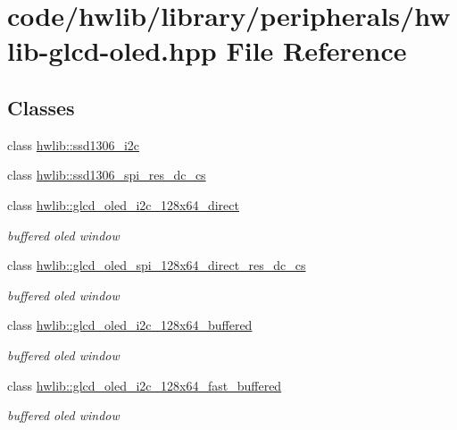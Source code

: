 \hypertarget{library_2peripherals_2hwlib-glcd-oled_8hpp}{}\section{code/hwlib/library/peripherals/hwlib-\/glcd-\/oled.hpp File Reference}
\label{library_2peripherals_2hwlib-glcd-oled_8hpp}
\subsection*{Classes}
\begin{DoxyCompactItemize}
\item 
class \hyperlink{classhwlib_1_1ssd1306__i2c}{hwlib\+::ssd1306\+\_\+i2c}
\item 
class \hyperlink{classhwlib_1_1ssd1306__spi__res__dc__cs}{hwlib\+::ssd1306\+\_\+spi\+\_\+res\+\_\+dc\+\_\+cs}
\item 
class \hyperlink{classhwlib_1_1glcd__oled__i2c__128x64__direct}{hwlib\+::glcd\+\_\+oled\+\_\+i2c\+\_\+128x64\+\_\+direct}
\begin{DoxyCompactList}\small\item\em buffered oled window \end{DoxyCompactList}\item 
class \hyperlink{classhwlib_1_1glcd__oled__spi__128x64__direct__res__dc__cs}{hwlib\+::glcd\+\_\+oled\+\_\+spi\+\_\+128x64\+\_\+direct\+\_\+res\+\_\+dc\+\_\+cs}
\begin{DoxyCompactList}\small\item\em buffered oled window \end{DoxyCompactList}\item 
class \hyperlink{classhwlib_1_1glcd__oled__i2c__128x64__buffered}{hwlib\+::glcd\+\_\+oled\+\_\+i2c\+\_\+128x64\+\_\+buffered}
\begin{DoxyCompactList}\small\item\em buffered oled window \end{DoxyCompactList}\item 
class \hyperlink{classhwlib_1_1glcd__oled__i2c__128x64__fast__buffered}{hwlib\+::glcd\+\_\+oled\+\_\+i2c\+\_\+128x64\+\_\+fast\+\_\+buffered}
\begin{DoxyCompactList}\small\item\em buffered oled window \end{DoxyCompactList}\end{DoxyCompactItemize}
